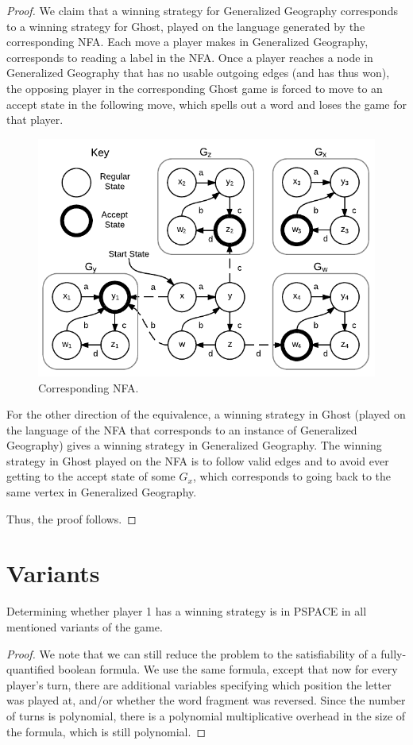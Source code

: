 \documentclass[runningheads,a4paper]{llncs}
\begin{document}
\begin{proof}
We claim that a winning strategy for Generalized Geography corresponds to a winning strategy for Ghost, played on the language generated by the corresponding NFA. Each move a player makes in Generalized Geography, corresponds to reading a label in the NFA. Once a player reaches a node in Generalized Geography that has no usable outgoing edges (and has thus won), the opposing player in the corresponding Ghost game is forced to move to an accept state in the following move, which spells out a word and loses the game for that player. 


\begin{figure}[!ht]
\centering
\includegraphics[width=0.6\linewidth]{Ghost2.pdf}
\caption{Corresponding NFA.}
\label{fig:reduction}
\end{figure}

For the other direction of the equivalence, a winning strategy in Ghost (played on the language of the NFA that corresponds to an instance of Generalized Geography) gives a winning strategy in Generalized Geography. The winning strategy in Ghost played on the NFA is to follow valid edges and to avoid ever getting to the accept state of some $G_x$, which corresponds to going back to the same vertex in Generalized Geography.

Thus, the proof follows. 
\end{proof}

\section{Variants}
\label{Variants}

\begin{corollary}
Determining whether player 1 has a winning strategy is in PSPACE in all mentioned variants of the game.
\end{corollary}

\begin{proof}
We note that we can still reduce the problem to the satisfiability of a fully-quantified boolean formula. We use the same formula, except that now for every player's turn, there are additional variables specifying which position the letter was played at, and/or whether the word fragment was reversed. Since the number of turns is polynomial, there is a polynomial multiplicative overhead in the size of the formula, which is still polynomial. 
\end{proof}
\end{document}
